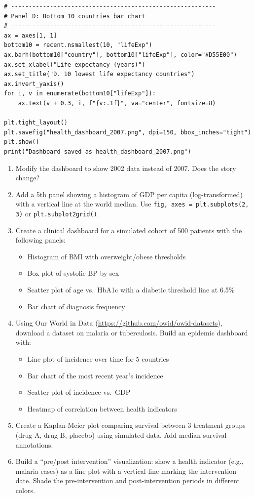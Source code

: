 \begin{verbatim}
# ----------------------------------------------------------
# Panel D: Bottom 10 countries bar chart
# ----------------------------------------------------------
ax = axes[1, 1]
bottom10 = recent.nsmallest(10, "lifeExp")
ax.barh(bottom10["country"], bottom10["lifeExp"], color="#D55E00")
ax.set_xlabel("Life expectancy (years)")
ax.set_title("D. 10 lowest life expectancy countries")
ax.invert_yaxis()
for i, v in enumerate(bottom10["lifeExp"]):
    ax.text(v + 0.3, i, f"{v:.1f}", va="center", fontsize=8)

plt.tight_layout()
plt.savefig("health_dashboard_2007.png", dpi=150, bbox_inches="tight")
plt.show()
print("Dashboard saved as health_dashboard_2007.png")
\end{verbatim}

\begin{exercise}
\begin{enumerate}
  \item Modify the dashboard to show 2002 data instead of 2007. Does the story change?
  \item Add a 5th panel showing a histogram of GDP per capita (log-transformed) with a vertical line at the world median. Use \texttt{fig, axes = plt.subplots(2, 3)} or \texttt{plt.subplot2grid()}.
  \item Create a clinical dashboard for a simulated cohort of 500 patients with the following panels:
    \begin{itemize}
      \item Histogram of BMI with overweight/obese thresholds
      \item Box plot of systolic BP by sex
      \item Scatter plot of age vs.\ HbA1c with a diabetic threshold line at 6.5\%
      \item Bar chart of diagnosis frequency
    \end{itemize}
  \item Using Our World in Data (\url{https://github.com/owid/owid-datasets}), download a dataset on malaria or tuberculosis. Build an epidemic dashboard with:
    \begin{itemize}
      \item Line plot of incidence over time for 5 countries
      \item Bar chart of the most recent year's incidence
      \item Scatter plot of incidence vs.\ GDP
      \item Heatmap of correlation between health indicators
    \end{itemize}
  \item Create a Kaplan-Meier plot comparing survival between 3 treatment groups (drug A, drug B, placebo) using simulated data. Add median survival annotations.
  \item Build a ``pre/post intervention'' visualization: show a health indicator (e.g., malaria cases) as a line plot with a vertical line marking the intervention date. Shade the pre-intervention and post-intervention periods in different colors.
\end{enumerate}
\end{exercise}

